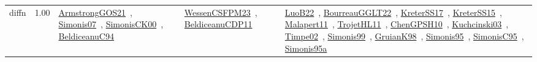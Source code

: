 {\begin{longtable}{p{3cm}r>{\raggedright\arraybackslash}p{6cm}>{\raggedright\arraybackslash}p{6cm}>{\raggedright\arraybackslash}p{8cm}}
\index{diffn}\index{Constraints!diffn}diffn &  1.00 & \href{../works/ArmstrongGOS21.pdf}{ArmstrongGOS21}~\cite{ArmstrongGOS21}, \href{../works/Simonis07.pdf}{Simonis07}~\cite{Simonis07}, \href{../works/SimonisCK00.pdf}{SimonisCK00}~\cite{SimonisCK00}, \href{../works/BeldiceanuC94.pdf}{BeldiceanuC94}~\cite{BeldiceanuC94} & \href{../works/WessenCSFPM23.pdf}{WessenCSFPM23}~\cite{WessenCSFPM23}, \href{../works/BeldiceanuCDP11.pdf}{BeldiceanuCDP11}~\cite{BeldiceanuCDP11} & \href{../works/LuoB22.pdf}{LuoB22}~\cite{LuoB22}, \href{../works/BourreauGGLT22.pdf}{BourreauGGLT22}~\cite{BourreauGGLT22}, \href{../works/KreterSS17.pdf}{KreterSS17}~\cite{KreterSS17}, \href{../works/KreterSS15.pdf}{KreterSS15}~\cite{KreterSS15}, \href{../works/Malapert11.pdf}{Malapert11}~\cite{Malapert11}, \href{../works/TrojetHL11.pdf}{TrojetHL11}~\cite{TrojetHL11}, \href{../works/ChenGPSH10.pdf}{ChenGPSH10}~\cite{ChenGPSH10}, \href{../works/Kuchcinski03.pdf}{Kuchcinski03}~\cite{Kuchcinski03}, \href{../works/Timpe02.pdf}{Timpe02}~\cite{Timpe02}, \href{../works/Simonis99.pdf}{Simonis99}~\cite{Simonis99}, \href{../works/GruianK98.pdf}{GruianK98}~\cite{GruianK98}, \href{../works/Simonis95.pdf}{Simonis95}~\cite{Simonis95}, \href{../works/SimonisC95.pdf}{SimonisC95}~\cite{SimonisC95}, \href{../works/Simonis95a.pdf}{Simonis95a}~\cite{Simonis95a}\\

\end{longtable}}
